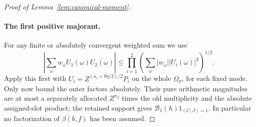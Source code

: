 \documentclass[12pt]{article}
\begin{document}
\begin{proof}[Proof of Lemma~\ref{lem:canonical-moment}]
\paragraph{The first positive majorant.}
For any finite or absolutely convergent weighted sum we use
\begin{equation}\tag{D}\label{eq:weighted-cauchy}
 \left|\sum_\omega w_\omega U_1(\omega)\overline{U_2(\omega)}\right|
 \le\prod_{i=1}^2
       \left(\sum_\omega|w_\omega||U_i(\omega)|^2\right)^{1/2}.
\end{equation}
Apply this first with \(U_i=Z^{(\kappa_i+9\eta/2)/2}P_i\) on the whole
\(\Omega_\sigma\), for each fixed mode.  Only now bound the outer
factors absolutely.  Their pure arithmetic magnitudes are at most a
separately allocated \(Z^{\pi_\beta}\) times the old multiplicity and
the absolute assigned-slot product; the retained support gives
\(\mathcal B_1(h)1_{(C,J)=1}\).  In particular no factorization of
\(\beta(b,f)\) has been assumed.


\end{proof}
\end{document}
